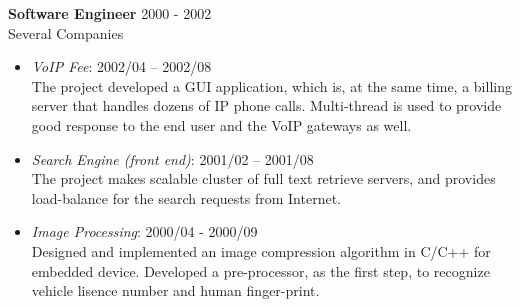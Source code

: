 \textbf{Software Engineer} \hfill 2000 - 2002 \\
        Several Companies
        \begin{itemize}  \itemsep -2pt %
            \item {\em VoIP Fee}: 2002/04 – 2002/08 \\ 
            The project developed a GUI application, which is, at the same time, a billing server
            that handles dozens of IP phone calls.
            Multi-thread is used to provide good response to the end user and the VoIP gateways as well.
            \item {\em Search Engine (front end)}:  2001/02 -- 2001/08 \\
                The project makes scalable cluster of full text retrieve servers,
            and provides load-balance for the search requests from Internet. 
            \item {\em Image Processing}: 2000/04 - 2000/09\\
                Designed and implemented an image compression algorithm in C/C++ for embedded device.
                Developed a pre-processor, as the first step,
                to recognize vehicle lisence number and human finger-print.
        \end{itemize}
